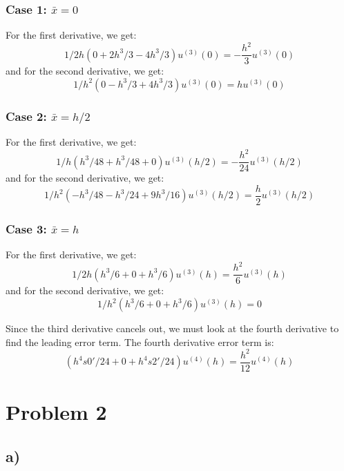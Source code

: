 \documentclass{article}
\begin{document}
\subsubsection*{Case 1: $\bar x=0$}
For the first derivative, we get:
\begin{equation}
1/2h(0+2h^3/3-4h^3/3)u^{(3)}(0)=\boxed{-\frac{h^2}{3}u^{(3)}(0)}
\end{equation}
and for the second derivative, we get:
\begin{equation}
1/h^2(0-h^3/3+4h^3/3)u^{(3)}(0)=\boxed{hu^{(3)}(0)}
\end{equation}

\subsubsection*{Case 2: $\bar x=h/2$}
For the first derivative, we get:
\begin{equation}
1/h(h^3/48+h^3/48+0)u^{(3)}(h/2)=\boxed{-\frac{h^2}{24}u^{(3)}(h/2)}
\end{equation}
and for the second derivative, we get:
\begin{equation}
1/h^2(-h^3/48-h^3/24+9h^3/16)u^{(3)}(h/2)=\boxed{\frac{h}{2}u^{(3)}(h/2)}
\end{equation}

\subsubsection*{Case 3: $\bar x=h$}
For the first derivative, we get:
\begin{equation}
1/2h(h^3/6+0+h^3/6)u^{(3)}(h)=\boxed{\frac{h^2}{6}u^{(3)}(h)}
\end{equation}
and for the second derivative, we get:
\begin{equation}
1/h^2(h^3/6+0+h^3/6)u^{(3)}(h)=0
\end{equation}

Since the third derivative cancels out, we must look at the fourth derivative to find the leading error term. The fourth derivative error term is:
\begin{equation}
(h^4s0'/24+0+h^4s2'/24)u^{(4)}(h)=\boxed{\frac{h^2}{12}u^{(4)}(h)}
\end{equation}
\section*{Problem 2}
\subsection*{a)}
\end{document}
